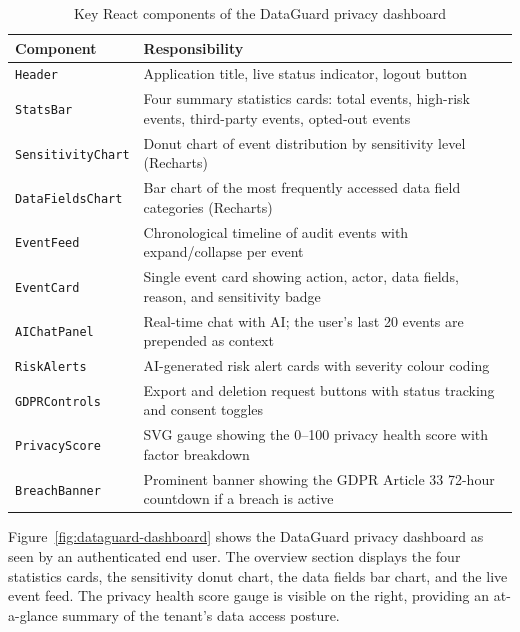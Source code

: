 \documentclass[a4paper,12pt,onecolumn]{report}
\begin{document}
\begin{table}[h]
    \begin{center}
        \begin{tabularx}{\textwidth}{|l|X|}
            \hline
            \textbf{Component} & \textbf{Responsibility} \\
            \hline
            \texttt{Header} & Application title, live status indicator, logout button \\
            \hline
            \texttt{StatsBar} & Four summary statistics cards: total events, high-risk events, third-party events, opted-out events \\
            \hline
            \texttt{SensitivityChart} & Donut chart of event distribution by sensitivity level (Recharts) \\
            \hline
            \texttt{DataFieldsChart} & Bar chart of the most frequently accessed data field categories (Recharts) \\
            \hline
            \texttt{EventFeed} & Chronological timeline of audit events with expand/collapse per event \\
            \hline
            \texttt{EventCard} & Single event card showing action, actor, data fields, reason, and sensitivity badge \\
            \hline
            \texttt{AIChatPanel} & Real-time chat with AI; the user's last 20 events are prepended as context \\
            \hline
            \texttt{RiskAlerts} & AI-generated risk alert cards with severity colour coding \\
            \hline
            \texttt{GDPRControls} & Export and deletion request buttons with status tracking and consent toggles \\
            \hline
            \texttt{PrivacyScore} & SVG gauge showing the 0--100 privacy health score with factor breakdown \\
            \hline
            \texttt{BreachBanner} & Prominent banner showing the GDPR Article 33 72-hour countdown if a breach is active \\
            \hline
        \end{tabularx}
    \end{center}
    \caption{Key React components of the DataGuard privacy dashboard}
    \label{tab:components}
\end{table}

Figure~\ref{fig:dataguard-dashboard} shows the DataGuard privacy dashboard as seen by an authenticated end user.
The overview section displays the four statistics cards, the sensitivity donut chart, the data fields bar chart, and the live event feed.
The privacy health score gauge is visible on the right, providing an at-a-glance summary of the tenant's data access posture.
\end{document}
